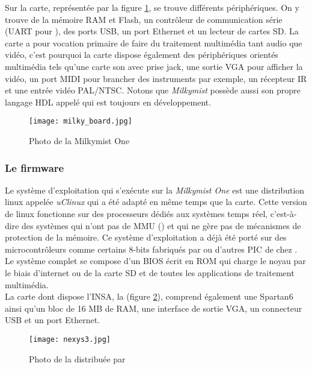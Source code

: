 Sur la carte, représentée par la figure \ref{milky-board}, se trouve différents périphériques. On y trouve de la mémoire RAM et Flash, un contrôleur de communication série (UART pour ), des ports USB, un port Ethernet et un lecteur de cartes SD.
La carte a pour vocation primaire de faire du traitement multimédia tant audio que vidéo, c'est pourquoi la carte dispose également des périphériques orientés multimédia tels qu'une carte son avec prise jack, une sortie VGA pour afficher la vidéo, un port MIDI pour brancher des instruments par exemple, un récepteur IR et une entrée vidéo PAL/NTSC. Notons que \textit{Milkymist} possède aussi son propre langage HDL appelé  qui est toujours en développement.

\begin{figure}[h!]
\centering
\texttt{[image: milky\_board.jpg]}
\caption{Photo de la Milkymist One}
\label{milky-board}
\end{figure}

\subsubsection{Le firmware}

Le système d'exploitation qui s'exécute sur la \textit{Milkymist One} est une distribution linux appelée \textit{uClinux} qui a été adapté en même temps que la carte. Cette version de linux fonctionne sur des processeurs dédiés aux systèmes temps réel, c'est-à-dire des systèmes qui n'ont pas de MMU () et qui ne gère pas de mécanismes de protection de la mémoire. Ce système d'exploitation a déjà été porté sur des microcontrôleurs comme certains 8-bits fabriqués par  ou d'autres PIC de chez .\\
Le système complet se compose d'un BIOS écrit en ROM qui charge le noyau par le biais d'internet ou de la carte SD et de toutes les applications de traitement multimédia.\\

La carte dont dispose l'INSA, la  \nexys{} (figure \ref{nexys3-board}), comprend également une Spartan6 ainsi qu'un bloc de 16 MB de RAM, une interface de sortie VGA, un connecteur USB et un port Ethernet.

\begin{figure}[h!]
\centering
\texttt{[image: nexys3.jpg]}
\caption{Photo de la \nexys{} distribuée par }
\label{nexys3-board}
\end{figure}

